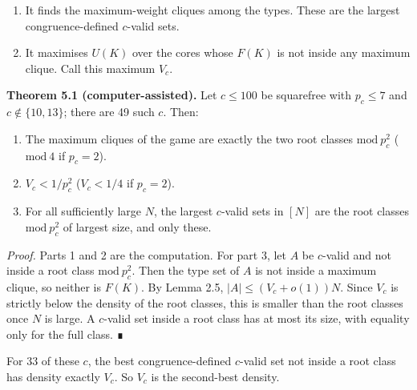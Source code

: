 \documentclass[
  11pt,
]{article}
\providecommand{\tightlist}{%
  \setlength{\itemsep}{0pt}\setlength{\parskip}{0pt}}
\begin{document}
\begin{enumerate}
\def\labelenumi{\arabic{enumi}.}
\tightlist
\item
  It finds the maximum-weight cliques among the types. These are the
  largest congruence-defined \(c\)-valid sets.
\item
  It maximises \(U(K)\) over the cores whose \(F(K)\) is not inside any
  maximum clique. Call this maximum \(V_c\).
\end{enumerate}

\textbf{Theorem 5.1 (computer-assisted).} Let \(c \le 100\) be
squarefree with \(p_c \le 7\) and \(c \notin \{10, 13\}\); there are 49
such \(c\). Then:

\begin{enumerate}
\def\labelenumi{\arabic{enumi}.}
\tightlist
\item
  The maximum cliques of the game are exactly the two root classes
  \(\mathrm{mod}\ p_c^2\) (\(\mathrm{mod}\ 4\) if \(p_c = 2\)).
\item
  \(V_c < 1/p_c^2\) (\(V_c < 1/4\) if \(p_c = 2\)).
\item
  For all sufficiently large \(N\), the largest \(c\)-valid sets in
  \([N]\) are the root classes \(\mathrm{mod}\ p_c^2\) of largest size,
  and only these.
\end{enumerate}

\emph{Proof.} Parts 1 and 2 are the computation. For part 3, let \(A\)
be \(c\)-valid and not inside a root class \(\mathrm{mod}\ p_c^2\). Then
the type set of \(A\) is not inside a maximum clique, so neither is
\(F(K)\). By Lemma 2.5, \(|A| \le (V_c + o(1))N\). Since \(V_c\) is
strictly below the density of the root classes, this is smaller than the
root classes once \(N\) is large. A \(c\)-valid set inside a root class
has at most its size, with equality only for the full class. ∎

For 33 of these \(c\), the best congruence-defined \(c\)-valid set not
inside a root class has density exactly \(V_c\). So \(V_c\) is the
second-best density.
\end{document}
